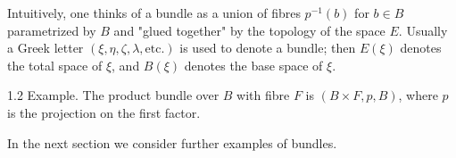 Intuitively, one thinks of a bundle as a union of fibres $p^{-1}(b)$ for $b \in B$ parametrized by $B$ and "glued together" by the topology of the space $E$. Usually a Greek letter $(\xi, \eta, \zeta, \lambda, \text{etc.})$ is used to denote a bundle; then $E(\xi)$ denotes the total space of $\xi$, and $B(\xi)$ denotes the base space of $\xi$.

1.2 Example. The product bundle over $B$ with fibre $F$ is $(B \times F, p, B)$, where $p$ is the projection on the first factor.

In the next section we consider further examples of bundles.
